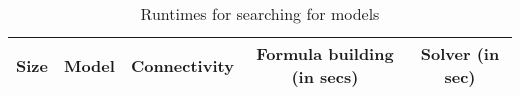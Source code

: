 \begin{table}[t]
  \centering
  \begin{tabular}[t]{|c|c|c|c|c|}\hline
    Size & Model & Connectivity &Formula building (in secs) & Solver (in sec) \\\hline
  \end{tabular}
  \caption{Runtimes for searching for models}
  \label{tab:qf-grabh}
\end{table}


